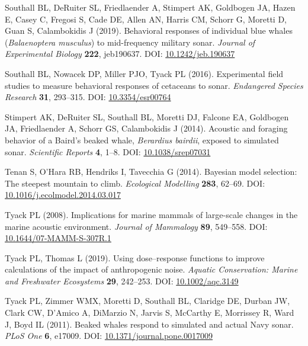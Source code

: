 \documentclass[
]{article}
\begin{document}
\leavevmode\hypertarget{ref-Southall2019}{}%
Southall BL, DeRuiter SL, Friedlaender A, Stimpert AK, Goldbogen JA, Hazen E, Casey C, Fregosi S, Cade DE, Allen AN, Harris CM, Schorr G, Moretti D, Guan S, Calambokidis J (2019). Behavioral responses of individual blue whales (\emph{Balaenoptera musculus}) to mid-frequency military sonar. \emph{Journal of Experimental Biology} \textbf{222}, jeb190637. DOI: \href{https://doi.org/10.1242/jeb.190637}{10.1242/jeb.190637}

\leavevmode\hypertarget{ref-Southall2016}{}%
Southall BL, Nowacek DP, Miller PJO, Tyack PL (2016). Experimental field studies to measure behavioral responses of cetaceans to sonar. \emph{Endangered Species Research} \textbf{31}, 293--315. DOI: \href{https://doi.org/10.3354/esr00764}{10.3354/esr00764}

\leavevmode\hypertarget{ref-Stimpert2014}{}%
Stimpert AK, DeRuiter SL, Southall BL, Moretti DJ, Falcone EA, Goldbogen JA, Friedlaender A, Schorr GS, Calambokidis J (2014). Acoustic and foraging behavior of a Baird's beaked whale, \emph{Berardius bairdii}, exposed to simulated sonar. \emph{Scientific Reports} \textbf{4}, 1--8. DOI: \href{https://doi.org/10.1038/srep07031}{10.1038/srep07031}

\leavevmode\hypertarget{ref-Tenan2014}{}%
Tenan S, O'Hara RB, Hendriks I, Tavecchia G (2014). Bayesian model selection: The steepest mountain to climb. \emph{Ecological Modelling} \textbf{283}, 62--69. DOI: \href{https://doi.org/10.1016/j.ecolmodel.2014.03.017}{10.1016/j.ecolmodel.2014.03.017}

\leavevmode\hypertarget{ref-Tyack2008}{}%
Tyack PL (2008). Implications for marine mammals of large-scale changes in the marine acoustic environment. \emph{Journal of Mammalogy} \textbf{89}, 549--558. DOI: \href{https://doi.org/10.1644/07-MAMM-S-307R.1}{10.1644/07-MAMM-S-307R.1}

\leavevmode\hypertarget{ref-Tyack2019}{}%
Tyack PL, Thomas L (2019). Using dose--response functions to improve calculations of the impact of anthropogenic noise. \emph{Aquatic Conservation: Marine and Freshwater Ecosystems} \textbf{29}, 242--253. DOI: \href{https://doi.org/10.1002/aqc.3149}{10.1002/aqc.3149}

\leavevmode\hypertarget{ref-Tyack2011}{}%
Tyack PL, Zimmer WMX, Moretti D, Southall BL, Claridge DE, Durban JW, Clark CW, D'Amico A, DiMarzio N, Jarvis S, McCarthy E, Morrissey R, Ward J, Boyd IL (2011). Beaked whales respond to simulated and actual Navy sonar. \emph{PLoS One} \textbf{6}, e17009. DOI: \href{https://doi.org/10.1371/journal.pone.0017009}{10.1371/journal.pone.0017009}
\end{document}
